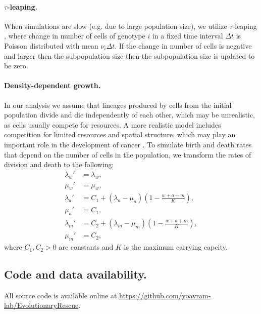 \documentclass[12pt]{extarticle}
\begin{document}
\paragraph{$\tau$-leaping.}
When simulations are slow (e.g. due to large population size), we utilize $\tau$-leaping \citep{gillespie2001approximate}, where change in number of cells of genotype $i$ in a fixed time interval $\Delta t$ is Poisson distributed with mean $\nu_i\Delta t$.
If the change in number of cells is negative and larger then the subpopulation size then the subpopulation size is updated to be zero.


\paragraph{Density-dependent growth.}

In our analysis we assume that lineages produced by cells from the initial population divide and die independently of each other, which may be unrealistic, as cells usually compete for resources.
A more realistic model includes competition for limited resources and spatial structure, which may play an important role in the development of cancer \citep[e.g.,][]{martens2011spatial}.
To simulate birth and death rates that depend on the number of cells in the population, we transform the rates of division and death to the following:
\begin{align*}
\lambda_w' &= \lambda_w, \\
\mu_w' &= \mu_w,\\
\lambda_a' &= C_1+\left(\lambda_a-\mu_a\right)\left(1-\frac{w+a+m}{K}\right),\\ 
\mu_a' &= C_1,\\
\lambda_m' &= C_2+\left(\lambda_m-\mu_m\right)\left(1-\frac{w+a+m}{K}\right),\\ 
\mu_m' &= C_2,
\end{align*}
where $C_1, C_2>0$ are constants and $K$ is the maximum carrying capcity. %


\subsection*{Code and data availability.} All source code is available online at \url{https://github.com/yoavram-lab/EvolutionaryRescue}.
\end{document}

